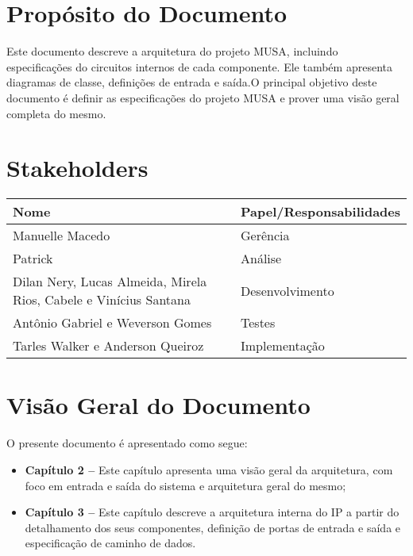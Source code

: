\section{Propósito do Documento}
  Este documento descreve a arquitetura do projeto MUSA, incluindo especificações do circuitos internos de cada componente. Ele também apresenta diagramas de classe, definições de entrada e saída.O principal objetivo deste documento é definir as especificações do projeto MUSA e prover uma visão geral completa do mesmo.

  \section{Stakeholders}
    \FloatBarrier
    \begin{table}[H] 
      \begin{center}
        \begin{tabular}[pos]{|m{6cm} | m{8cm}|} 
          \hline 
          \cellcolor[gray]{0.9}\textbf{Nome} & \cellcolor[gray]{0.9}\textbf{Papel/Responsabilidades} \\  
           \hline Manuelle Macedo 	& Gerência \\
           \hline Patrick 	& Análise \\
           \hline Dilan Nery, Lucas Almeida, Mirela Rios, Cabele e Vinícius Santana	& Desenvolvimento \\
           \hline Antônio Gabriel e Weverson Gomes	& Testes       \\
           \hline Tarles Walker e Anderson Queiroz 	& Implementação \\ \hline
        \end{tabular}
      \end{center}
    \end{table} 

\section{Visão Geral do Documento}

O presente documento é apresentado como segue:

  \begin{itemize}
   \item \textbf{Capítulo 2 --} Este capítulo apresenta uma visão geral da arquitetura, com foco em entrada e saída do sistema e arquitetura geral do mesmo;
   \item \textbf{Capítulo 3 --} Este capítulo descreve a arquitetura interna do IP a partir do detalhamento dos seus componentes, definição de portas de entrada e saída e especificação de caminho de dados.
  \end{itemize}

